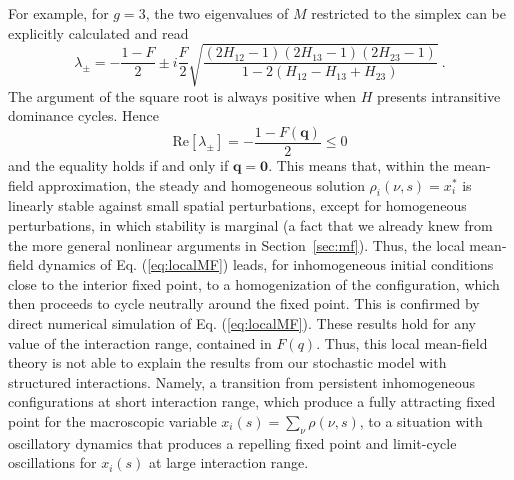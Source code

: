 For example, for $g=3$, the two eigenvalues of $M$ restricted
to the simplex can be explicitly calculated and read
\begin{equation}
  \lambda_\pm=-\frac{1-F}{2}
  \pm i \frac{F}{2}\sqrt{\frac{(2H_{12}-1)(2H_{13}-1)(2H_{23}-1)}{1 - 2(H_{12}-H_{13}+H_{23})}} \ .
\end{equation}
The argument of the square root is always positive when $H$
presents intransitive dominance cycles. Hence
\begin{equation}
  \textrm{Re}[\lambda_\pm]=-\frac{1-F(\mathbf q)}{2}\le 0
\end{equation}
and the equality holds if and only if $\mathbf q=\mathbf 0$.
This means that, within the mean-field approximation, the
steady and homogeneous solution $\rho_i(\nu,s)=x_i^*$ is 
linearly stable against small spatial perturbations, except for
homogeneous perturbations, in which stability is marginal (a
fact that we already knew from the more general nonlinear
arguments in Section~\ref{sec:mf}). Thus, the local mean-field
dynamics of Eq. (\ref{eq:localMF}) leads, for inhomogeneous
initial conditions close to the interior fixed point, to a
homogenization of the configuration, which then proceeds to
cycle neutrally around the fixed point. This is confirmed by
direct numerical simulation of Eq. (\ref{eq:localMF}). These
results hold for any value of the interaction range, contained
in $F(q)$. Thus, this local mean-field theory is not able to
explain the results from our stochastic model with structured
interactions. Namely, a transition from persistent inhomogeneous
configurations at short interaction range, which produce a
fully attracting fixed point for the macroscopic variable
$x_i(s)=\sum_\nu \rho(\nu,s)$, to a situation with
oscillatory dynamics that produces a repelling fixed point and
limit-cycle oscillations for $x_i(s)$ at large interaction
range.

